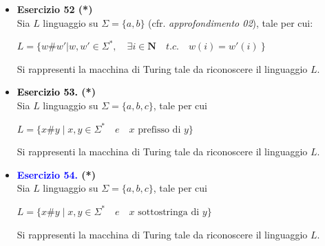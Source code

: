 \documentclass[a4paper,10pt]{article}
\begin{document}
{\normalsize
\begin{itemize}[label=, leftmargin=0pt]

    \item \textbf{Esercizio 52 (*)}\\ Sia $L$ linguaggio su $\Sigma=\{a,b\}$ (cfr. \textit{approfondimento 02}), tale per cui:
    {\begin{center}
        $L=\{w\#w'| w,w'\in\Sigma^*, \quad \exists i \in \mathbf{N} \quad t.c.\quad  w(i)=w'(i)\ \}$
    \end{center}} 
    Si rappresenti la macchina di Turing tale da riconoscere il linguaggio $L$.\\[0.1cm]

    
    \item \textbf{\textcolor{black}{Esercizio 53.} (*)}\\ Sia $L$ linguaggio su $\Sigma=\{a,b,c\}$, tale per cui 
    {\begin{center}
        $L = \{ x\#y \mid x,y\in\Sigma^*\quad e \quad x \text{ prefisso di }y\}$
    \end{center}}
    Si rappresenti la macchina di Turing tale da riconoscere il linguaggio $L$.\\[0.1cm]

    
    \item \textbf{\textcolor{blue}{Esercizio 54.} (*)}\\ Sia $L$ linguaggio su $\Sigma=\{a,b,c\}$, tale per cui 
    {\begin{center}
        $L = \{ x\#y \mid x,y\in\Sigma^*\quad e \quad x \text{ sottostringa di }y\}$
    \end{center}}
    Si rappresenti la macchina di Turing tale da riconoscere il linguaggio $L$.\\[0.1cm]
    

\end{itemize}}
\end{document}
